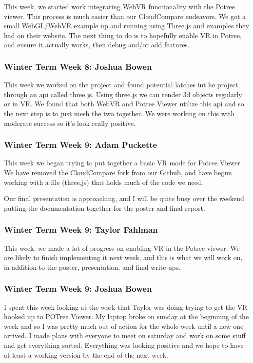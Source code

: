 \documentclass[draftclsnofoot,onecolumn]{IEEEtran}
\begin{document}
This week, we started work integrating WebVR functionality with the Potree viewer. This process is much easier than our CloudCompare endeavors. We got a small WebGL/WebVR example up and running using Three.js and examples they had on their website. The next thing to do is to hopefully enable VR in Potree, and ensure it actually works, then debug and/or add features.

\subsubsection{Winter Term Week 8: Joshua Bowen}

This week we worked on the project and found potential latches int he project through an api called three.js. Using three.js we can render 3d objects regularly or in VR. We found that both WebVR and Potree Viewer utilize this api and so the next step is to just mesh the two together. We were working on this with moderate success so it's look really positive.

\subsubsection{Winter Term Week 9: Adam Puckette}

This week we began trying to put together a basic VR mode for Potree Viewer. We have removed the CloudCompare fork from our Github, and have begun working with a file (three.js) that holds much of the code we need.

Our final presentation is approaching, and I will be quite busy over the weekend putting the documentation together for the poster and final report.

\subsubsection{Winter Term Week 9: Taylor Fahlman}

This week, we made a lot of progress on enabling VR in the Potree viewer. We are likely to finish implementing it next week, and this is what we will work on, in addition to the poster, presentation, and final write-ups.

\subsubsection{Winter Term Week 9: Joshua Bowen}

I spent this week looking at the work that Taylor was doing trying to get the VR hooked up to POTree Viewer. My laptop broke on sunday at the beginning of the week and so I was pretty much out of action for the whole week until a new one arrived. I made plans with everyone to meet on saturday and work on some stuff and get everything sorted. Everything was looking positive and we hope to have at least a working version by the end of the next week.
\end{document}
